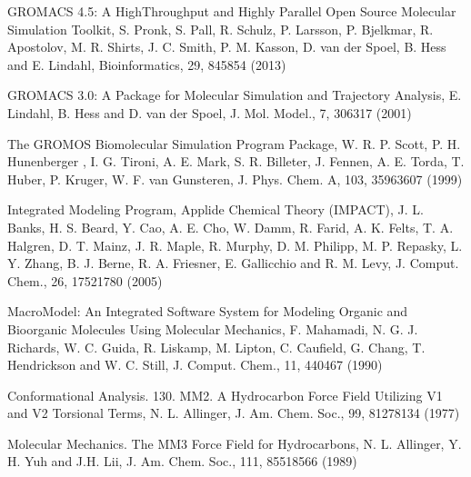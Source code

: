 \documentclass[letterpaper,11pt,english]{sphinxmanual}
\begin{document}
\sphinxAtStartPar
GROMACS 4.5: A High\sphinxhyphen{}Throughput and Highly Parallel Open Source Molecular Simulation Toolkit, S. Pronk, S. Pall, R. Schulz, P. Larsson, P. Bjelkmar, R. Apostolov, M. R. Shirts, J. C. Smith, P. M. Kasson, D. van der Spoel, B. Hess and E. Lindahl, Bioinformatics, 29, 845\sphinxhyphen{}854 (2013)

\sphinxAtStartPar
GROMACS 3.0: A Package for Molecular Simulation and Trajectory Analysis, E. Lindahl, B. Hess and D. van der Spoel, J. Mol. Model., 7, 306\sphinxhyphen{}317 (2001)

\sphinxAtStartPar
{}

\sphinxAtStartPar
The GROMOS Biomolecular Simulation Program Package, W. R. P. Scott, P. H. Hunenberger , I. G. Tironi, A. E. Mark, S. R. Billeter, J. Fennen, A. E. Torda, T. Huber, P. Kruger, W. F. van Gunsteren, J. Phys. Chem. A, 103, 3596\sphinxhyphen{}3607 (1999)

\sphinxAtStartPar
{}

\sphinxAtStartPar
Integrated Modeling Program, Applide Chemical Theory (IMPACT), J. L. Banks, H. S. Beard, Y. Cao, A. E. Cho, W. Damm, R. Farid, A. K. Felts, T. A. Halgren, D. T. Mainz, J. R. Maple, R. Murphy, D. M. Philipp, M. P. Repasky, L. Y. Zhang, B. J. Berne, R. A. Friesner, E. Gallicchio and R. M. Levy, J. Comput. Chem., 26, 1752\sphinxhyphen{}1780 (2005)

\sphinxAtStartPar
{}

\sphinxAtStartPar
MacroModel: An Integrated Software System for Modeling Organic and Bioorganic Molecules Using Molecular Mechanics, F. Mahamadi, N. G. J. Richards, W. C. Guida, R. Liskamp, M. Lipton, C. Caufield, G. Chang, T. Hendrickson and W. C. Still, J. Comput. Chem., 11, 440\sphinxhyphen{}467 (1990)

\sphinxAtStartPar
{}

\sphinxAtStartPar
Conformational Analysis. 130. MM2. A Hydrocarbon Force Field Utilizing V1 and V2 Torsional Terms, N. L. Allinger, J. Am. Chem. Soc., 99, 8127\sphinxhyphen{}8134 (1977)

\sphinxAtStartPar
{}

\sphinxAtStartPar
Molecular Mechanics. The MM3 Force Field for Hydrocarbons, N. L. Allinger, Y. H. Yuh and J.\sphinxhyphen{}H. Lii, J. Am. Chem. Soc., 111, 8551\sphinxhyphen{}8566 (1989)

\sphinxAtStartPar
{}
\end{document}
